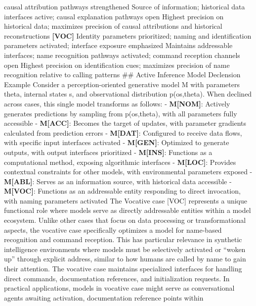 \documentclass[
  11pt,
  letterpaper,
]{article}
\begin{document}
causal attribution pathways strengthened \textbar{} Source of
information; historical data interfaces active; causal explanation
pathways open \textbar{} Highest precision on historical data; maximizes
precision of causal attributions and historical reconstructions
\textbar{} \textbar{} \textbf{{[}VOC{]}} \textbar{} Identity parameters
prioritized; naming and identification parameters activated; interface
exposure emphasized \textbar{} Maintains addressable interfaces; name
recognition pathways activated; command reception channels open
\textbar{} Highest precision on identification cues; maximizes precision
of name recognition relative to calling patterns \textbar{} \#\# Active
Inference Model Declension Example Consider a perception-oriented
generative model M with parameters theta, internal states s, and
observational distribution p(o\textbar s,theta). When declined across
cases, this single model transforms as follows: - \textbf{M{[}NOM{]}}:
Actively generates predictions by sampling from p(o\textbar s,theta),
with all parameters fully accessible - \textbf{M{[}ACC{]}}: Becomes the
target of updates, with parameter gradients calculated from prediction
errors - \textbf{M{[}DAT{]}}: Configured to receive data flows, with
specific input interfaces activated - \textbf{M{[}GEN{]}}: Optimized to
generate outputs, with output interfaces prioritized -
\textbf{M{[}INS{]}}: Functions as a computational method, exposing
algorithmic interfaces - \textbf{M{[}LOC{]}}: Provides contextual
constraints for other models, with environmental parameters exposed -
\textbf{M{[}ABL{]}}: Serves as an information source, with historical
data accessible - \textbf{M{[}VOC{]}}: Functions as an addressable
entity responding to direct invocation, with naming parameters activated
The Vocative case {[}VOC{]} represents a unique functional role where
models serve as directly addressable entities within a model ecosystem.
Unlike other cases that focus on data processing or transformational
aspects, the vocative case specifically optimizes a model for name-based
recognition and command reception. This has particular relevance in
synthetic intelligence environments where models must be selectively
activated or ``woken up'' through explicit address, similar to how
humans are called by name to gain their attention. The vocative case
maintains specialized interfaces for handling direct commands,
documentation references, and initialization requests. In practical
applications, models in vocative case might serve as conversational
agents awaiting activation, documentation reference points within
\end{document}
